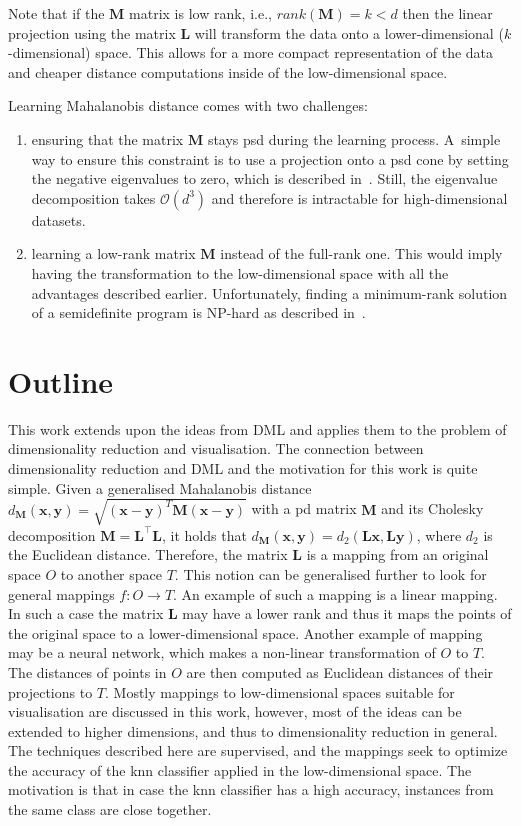 Note that if the $\bm{M}$ matrix is low rank, i.e., $rank(\bm{M})=k<d$ then the linear projection using the matrix $\bm{L}$ will transform the data onto a lower-dimensional ($k$-dimensional) space. This allows for a more compact representation of the data and cheaper distance computations inside of the low-dimensional space.

Learning Mahalanobis distance comes with two challenges:
\begin{enumerate}
\item ensuring that the matrix $\bm{M}$ stays \ac{psd} during the learning process. A~simple way to ensure this constraint is to use a projection onto a \ac{psd} cone by setting the negative eigenvalues to zero, which is described in~\citep{qian2015efficient}. Still, the eigenvalue decomposition takes $\mathcal{O}(d^3)$ and therefore is intractable for high-dimensional datasets.
\item learning a low-rank matrix $\bm{M}$ instead of the full-rank one. This would imply having the transformation to the low-dimensional space with all the advantages described earlier. Unfortunately, finding a minimum-rank solution of a semidefinite program is NP-hard as described in~\citep{lemon2016low}.
\end{enumerate}

\section{Outline}
This work extends upon the ideas from DML and applies them to the problem of dimensionality reduction and visualisation. The connection between dimensionality reduction and DML and the motivation for this work is quite simple. Given a generalised Mahalanobis distance $d_{\bm{M}}(\textbf{x},\textbf{y}) = \sqrt{(\textbf{x}-\textbf{y})^{T}\bm{M}(\textbf{x}-\textbf{y})}$ with a \ac{pd} matrix $\bm{M}$ and its Cholesky decomposition $\bm{M}=\bm{L}^\top\bm{L}$, it holds that $d_{\bm{M}}(\textbf{x},\textbf{y}) = d_{2}(\bm{L}\textbf{x},\bm{L}\textbf{y})$, where $d_2$ is the Euclidean distance. Therefore, the matrix $\bm{L}$ is a mapping from an original space $O$ to another space $T$. This notion can be generalised further to look for general mappings $f: O \to T$. An example of such a mapping is a linear mapping. In such a case the matrix $\bm{L}$ may have a lower rank and thus it maps the points of the original space to a lower-dimensional space. Another example of mapping may be a neural network, which makes a non-linear transformation of $O$ to $T$. The distances of points in $O$ are then computed as Euclidean distances of their projections to $T$. Mostly mappings to low-dimensional spaces suitable for visualisation are discussed in this work, however, most of the ideas can be extended to higher dimensions, and thus to dimensionality reduction in general. The techniques described here are supervised, and the mappings seek to optimize the accuracy of the \ac{knn} classifier applied in the low-dimensional space. The motivation is that in case the \ac{knn} classifier has a high accuracy, instances from the same class are close together.

